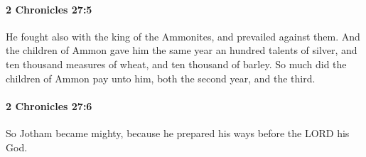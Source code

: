		\paragraph{2 Chronicles 27:5} %
			\label{2CHRONICLES-27-5}

			He fought also with the king of the Ammonites, and prevailed against them. And the children of Ammon gave him the same year an hundred talents of silver, and ten thousand measures of wheat, and ten thousand of barley. So much did the children of Ammon pay unto him, both the second year, and the third.


		\paragraph{2 Chronicles 27:6} %
			\label{2CHRONICLES-27-6}

			So Jotham became mighty, because he prepared his ways before the LORD his God.

